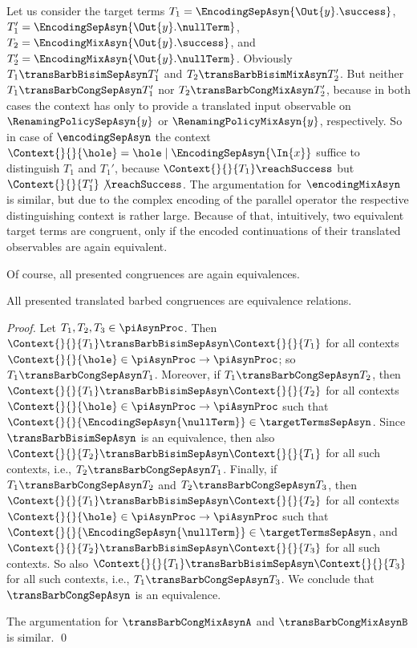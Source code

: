 \documentclass[]{llncs}
\begin{document}
\begin{example}
	Let us consider the target terms $ T_1 = \EncodingSepAsyn{\Out{y}.\success} $, $ T_1' = \EncodingSepAsyn{\Out{y}.\nullTerm} $, $ T_2 = \EncodingMixAsyn{\Out{y}.\success} $, and $ T_2' = \EncodingMixAsyn{\Out{y}.\nullTerm} $. Obviously $ T_1 \transBarbBisimSepAsyn T_1' $ and $ T_2 \transBarbBisimMixAsyn T_2' $. But neither $ T_1 \transBarbCongSepAsyn T_1' $ nor $ T_2 \transBarbCongMixAsyn T_2' $, because in both cases the context has only to provide a translated input observable on $ \RenamingPolicySepAsyn{y} $ or $ \RenamingPolicyMixAsyn{y} $, respectively. So in case of $ \encodingSepAsyn $ the context $ \Context{}{}{\hole} = \hole \mid \EncodingSepAsyn{\In{x}} $ suffice to distinguish $ T_1 $ and $ T_1' $, because $ \Context{}{}{T_1}\reachSuccess $ but $ \Context{}{}{T_1'}\not\reachSuccess $. The argumentation for $ \encodingMixAsyn $ is similar, but due to the complex encoding of the parallel operator the respective distinguishing context is rather large. Because of that, intuitively, two equivalent target terms are congruent, only if the encoded continuations of their translated observables are again equivalent.
\end{example}

Of course, all presented congruences are again equivalences.

\begin{lemma} \label{lem:transBarbCongIsEquivalence}
	All presented translated barbed congruences are equivalence relations.
\end{lemma}

\begin{proof}
	Let $ T_1, T_2, T_3 \in \piAsynProc $. Then $ \Context{}{}{T_1} \transBarbBisimSepAsyn \Context{}{}{T_1} $ for all contexts $ \Context{}{}{\hole} \in \piAsynProc \to \piAsynProc $; so $ T_1 \transBarbCongSepAsyn T_1 $. Moreover, if $ T_1 \transBarbCongSepAsyn T_2 $, then $ \Context{}{}{T_1} \transBarbBisimSepAsyn \Context{}{}{T_2} $ for all contexts $ \Context{}{}{\hole} \in \piAsynProc \to \piAsynProc $ such that $ \Context{}{}{\EncodingSepAsyn{\nullTerm}} \in \targetTermsSepAsyn $. Since $ \transBarbBisimSepAsyn $ is an equivalence, then also $ \Context{}{}{T_2} \transBarbBisimSepAsyn \Context{}{}{T_1} $ for all such contexts, i.e., $ T_2 \transBarbCongSepAsyn T_1 $. Finally, if $ T_1 \transBarbCongSepAsyn T_2 $ and $ T_2 \transBarbCongSepAsyn T_3 $, then $ \Context{}{}{T_1} \transBarbBisimSepAsyn \Context{}{}{T_2} $ for all contexts $ \Context{}{}{\hole} \in \piAsynProc \to \piAsynProc $ such that $ \Context{}{}{\EncodingSepAsyn{\nullTerm}} \in \targetTermsSepAsyn $, and $ \Context{}{}{T_2} \transBarbBisimSepAsyn \Context{}{}{T_3} $ for all such contexts. So also $ \Context{}{}{T_1} \transBarbBisimSepAsyn \Context{}{}{T_3} $ for all such contexts, i.e., $ T_1 \transBarbCongSepAsyn T_3 $. We conclude that $ \transBarbCongSepAsyn $ is an equivalence.
	
	The argumentation for $ \transBarbCongMixAsynA $ and $ \transBarbCongMixAsynB $ is similar.
	\qed
\end{proof}
\end{document}

